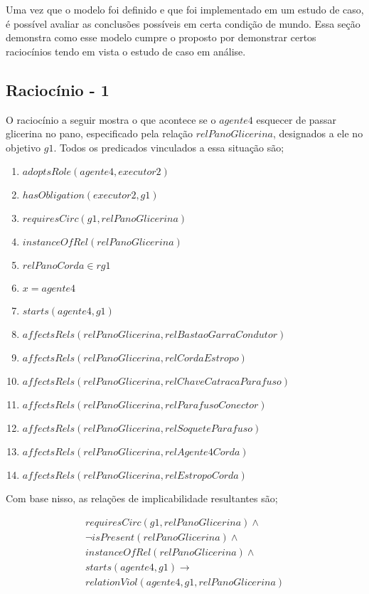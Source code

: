 \label{racs}

Uma vez que o modelo foi definido e que foi implementado em um estudo de caso, é possível avaliar as conclusões possíveis em certa condição de mundo. Essa seção demonstra como esse modelo cumpre o proposto por demonstrar certos raciocínios tendo em vista o estudo de caso em análise. 

\subsection{Raciocínio - 1} 
\label{raciocinio1}

O raciocínio a seguir mostra o que acontece se o $agente4$ esquecer de passar glicerina no pano, especificado pela relação $relPanoGlicerina$, designados a ele no objetivo $g1$. 
Todos os predicados vinculados a essa situação são;

\begin{enumerate}
	\item $adoptsRole(agente4,executor2)$ 
	\item $hasObligation(executor2,g1)$
	\item $requiresCirc(g1,relPanoGlicerina)$
	\item $instanceOfRel(relPanoGlicerina)$ 
	\item $relPanoCorda \in rg1$
	\item $ x = agente4 $
	\item $starts(agente4,g1)$
	\item $affectsRels(relPanoGlicerina,relBastaoGarraCondutor)$
	\item $affectsRels(relPanoGlicerina,relCordaEstropo)$  
	\item $affectsRels(relPanoGlicerina,relChaveCatracaParafuso)$
	\item $affectsRels(relPanoGlicerina,relParafusoConector)$ 
	\item $affectsRels(relPanoGlicerina,relSoqueteParafuso)$ 
	\item $affectsRels(relPanoGlicerina,relAgente4Corda)$ 
	\item $affectsRels(relPanoGlicerina,relEstropoCorda)$	
\end{enumerate}

Com base nisso, as relações de implicabilidade resultantes são;

\begin{eqnarray}\nonumber
	requiresCirc(g1,relPanoGlicerina) \wedge \nonumber \\  
	\neg isPresent(relPanoGlicerina) \wedge \nonumber \\   
	instanceOfRel(relPanoGlicerina) \wedge \nonumber \\   
	starts(agente4,g1) \to \nonumber \\
	relationViol(agente4,g1,relPanoGlicerina) \nonumber \\  
\end{eqnarray}

